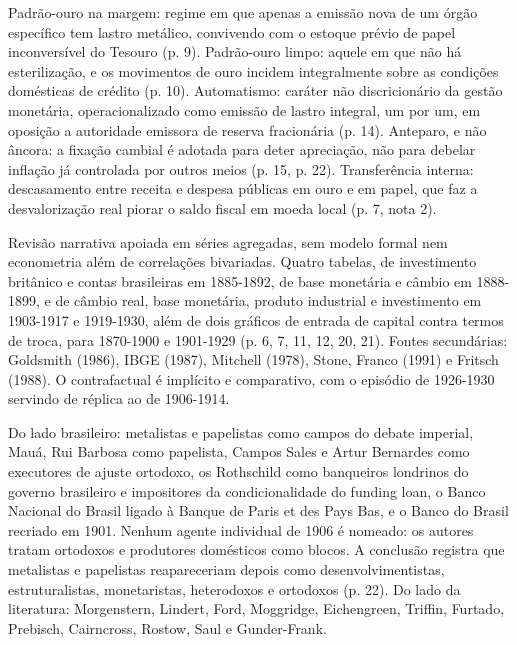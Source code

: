 


Padrão-ouro na margem: regime em que apenas a emissão nova de um órgão específico tem lastro metálico, convivendo com o estoque prévio de papel inconversível do Tesouro (p. 9). Padrão-ouro limpo: aquele em que não há esterilização, e os movimentos de ouro incidem integralmente sobre as condições domésticas de crédito (p. 10). Automatismo: caráter não discricionário da gestão monetária, operacionalizado como emissão de lastro integral, um por um, em oposição a autoridade emissora de reserva fracionária (p. 14). Anteparo, e não âncora: a fixação cambial é adotada para deter apreciação, não para debelar inflação já controlada por outros meios (p. 15, p. 22). Transferência interna: descasamento entre receita e despesa públicas em ouro e em papel, que faz a desvalorização real piorar o saldo fiscal em moeda local (p. 7, nota 2).


Revisão narrativa apoiada em séries agregadas, sem modelo formal nem econometria além de correlações bivariadas. Quatro tabelas, de investimento britânico e contas brasileiras em 1885-1892, de base monetária e câmbio em 1888-1899, e de câmbio real, base monetária, produto industrial e investimento em 1903-1917 e 1919-1930, além de dois gráficos de entrada de capital contra termos de troca, para 1870-1900 e 1901-1929 (p. 6, 7, 11, 12, 20, 21). Fontes secundárias: Goldsmith (1986), IBGE (1987), Mitchell (1978), Stone, Franco (1991) e Fritsch (1988). O contrafactual é implícito e comparativo, com o episódio de 1926-1930 servindo de réplica ao de 1906-1914.


Do lado brasileiro: metalistas e papelistas como campos do debate imperial, Mauá, Rui Barbosa como papelista, Campos Sales e Artur Bernardes como executores de ajuste ortodoxo, os Rothschild como banqueiros londrinos do governo brasileiro e impositores da condicionalidade do funding loan, o Banco Nacional do Brasil ligado à Banque de Paris et des Pays Bas, e o Banco do Brasil recriado em 1901. Nenhum agente individual de 1906 é nomeado: os autores tratam ortodoxos e produtores domésticos como blocos. A conclusão registra que metalistas e papelistas reapareceriam depois como desenvolvimentistas, estruturalistas, monetaristas, heterodoxos e ortodoxos (p. 22). Do lado da literatura: Morgenstern, Lindert, Ford, Moggridge, Eichengreen, Triffin, Furtado, Prebisch, Cairncross, Rostow, Saul e Gunder-Frank.

